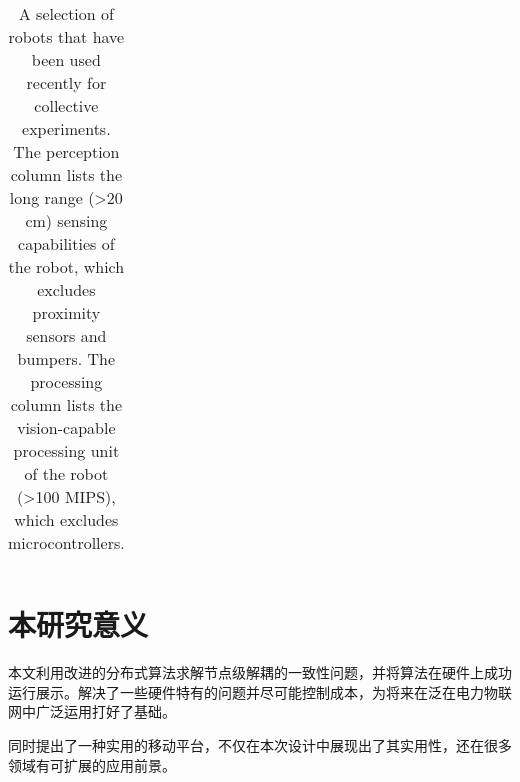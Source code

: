 \begin{landscape}
\begin{table}[htbp]
\begin{tabular}{l|lllllll}
    \end{tabular}
    \caption{A selection of robots that have been used recently for collective experiments. The perception column lists the long range (\textgreater 20 cm) sensing capabilities of the robot, which excludes proximity sensors and bumpers. The processing column lists the vision-capable processing unit of the robot (\textgreater 100 MIPS), which excludes microcontrollers.\cite{bonani2010marxbot}}
    \label{tab:collective}
    \end{table}
\end{landscape}


\section{本研究意义}

本文利用改进的分布式算法求解节点级解耦的一致性问题，并将算法在硬件上成功运行展示。解决了一些硬件特有的问题并尽可能控制成本，为将来在泛在电力物联网中广泛运用打好了基础。

同时提出了一种实用的移动平台，不仅在本次设计中展现出了其实用性，还在很多领域有可扩展的应用前景。